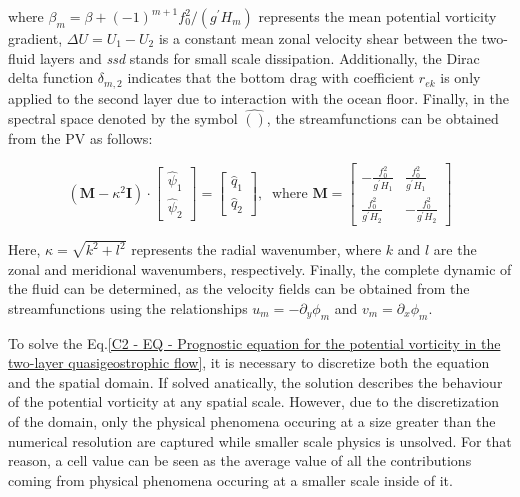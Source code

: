 where $\beta_m = \beta + (-1)^{m+1} f_0^2/(g^{\prime} H_m)$ represents the mean potential vorticity gradient, $\Delta U = U_1 - U_2$ is a constant mean zonal velocity shear between the two-fluid layers and \textit{ssd} stands for small scale dissipation. Additionally, the Dirac delta function $\delta_{m, 2}$ indicates that the bottom drag with coefficient $r_{ek}$ is only applied to the second layer due to interaction with the ocean floor. Finally, in the spectral space denoted by the symbol $\widehat{( )}$, the streamfunctions can be obtained from the PV as follows:

\vspace{-0.2em}
\begin{equation}
\left(\mathbf{M}-\kappa^2 \mathbf{I}\right) \cdot\left[\begin{array}{l}
\hat{\psi}_1 \\
\hat{\psi}_2
\end{array}\right]=\left[\begin{array}{l}
\hat{q}_1 \\
\hat{q}_2
\end{array}\right], \ \text { where } \mathbf{M}=\left[\begin{array}{cc}
-\frac{f_0^2}{g^{\prime} H_1} & \frac{f_0^2}{g^{\prime} H_1} \\
\frac{f_0^2}{g^{\prime} H_2} & -\frac{f_0^2}{g^{\prime} H_2}
\end{array}\right]
\label{C2 - EQ - Bridge between streamfunction and vorticities in spectral space}
\end{equation}
\vspace{+0.1em}

Here, $\kappa = \sqrt{k^2 + l^2}$ represents the radial wavenumber, where $k$ and $l$ are the zonal and meridional wavenumbers, respectively. Finally, the complete dynamic of the fluid can be determined, as the velocity fields can be obtained from the streamfunctions using the relationships $u_m = -\partial_y \phi_m$ and $v_m = \partial_x \phi_m$.

\vspace{-0.1em}
To solve the Eq.\ref{C2 - EQ - Prognostic equation for the potential vorticity in the two-layer quasigeostrophic flow}, it is necessary to discretize both the equation and the spatial domain. If solved anatically, the solution describes the behaviour of the potential vorticity at any spatial scale. However, due to the discretization of the domain, only the physical phenomena occuring at a size greater than the numerical resolution are captured while smaller scale physics is unsolved. For that reason, a cell value can be seen as the average value of all the contributions coming from physical phenomena occuring at a smaller scale inside of it.\\

